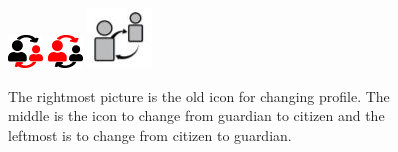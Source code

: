 \begin{figure}[htp]

    \centering
    \includegraphics[width=.1\textwidth]{figures/changeToGuardian}\hfill
    \includegraphics[width=.1\textwidth]{figures/changeToCitizen}\hfill
    \includegraphics[width=.1\textwidth]{figures/old-change-profile}
    
    \caption{The rightmost picture is the old icon for changing profile. The middle is the icon to change from guardian to citizen and the leftmost is to change from citizen to guardian.}
    \label{fig:change-profile-icons}
\end{figure}


